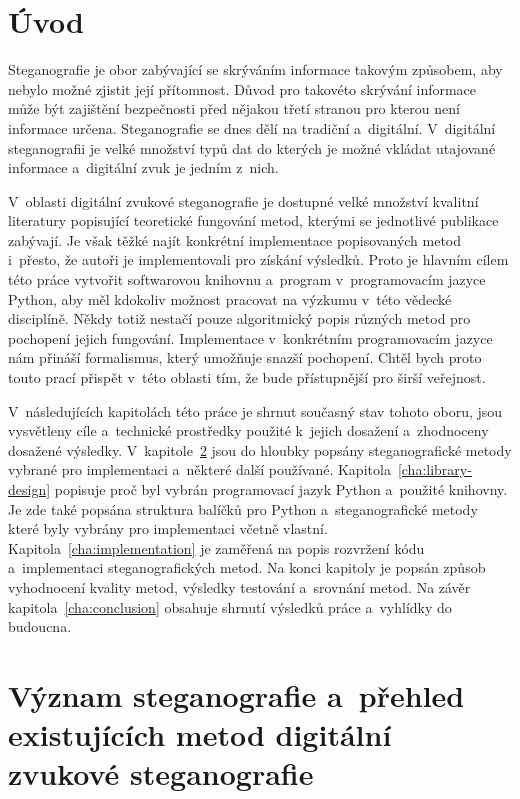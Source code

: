 \chapter{Úvod}
\label{cha:introduction}

Steganografie je obor zabývající se skrýváním informace takovým způsobem, aby
nebylo možné zjistit její přítomnost. Důvod pro takovéto skrývání informace
může být zajištění bezpečnosti před nějakou třetí stranou pro kterou není
informace určena. Steganografie se dnes dělí na tradiční a~digitální.
V~digitální steganografii je velké množství typů dat do kterých je možné
vkládat utajované informace a~digitální zvuk je jedním z~nich.

V~oblasti digitální zvukové steganografie je dostupné velké množství kvalitní
literatury popisující teoretické fungování metod, kterými se jednotlivé
publikace zabývají. Je však těžké najít konkrétní implementace popisovaných
metod i~přesto, že autoři je implementovali pro získání výsledků. Proto je
hlavním cílem této práce vytvořit softwarovou knihovnu a~program
v~programovacím jazyce Python, aby měl kdokoliv možnost pracovat na výzkumu
v~této vědecké disciplíně. Někdy totiž nestačí pouze algoritmický popis různých
metod pro pochopení jejich fungování. Implementace v~konkrétním programovacím
jazyce nám přináší formalismus, který umožňuje snazší pochopení. Chtěl bych
proto touto prací přispět v~této oblasti tím, že bude přístupnější pro širší
veřejnost.

V~následujících kapitolách této práce je shrnut současný stav tohoto oboru,
jsou vysvětleny cíle a~technické prostředky použité k~jejich dosažení
a~zhodnoceny dosažené výsledky. V~kapitole~\ref{cha:existing-methods}
 jsou do hloubky popsány steganografické metody vybrané pro
implementaci a~některé další používané. Kapitola~\ref{cha:library-design}
popisuje proč byl vybrán programovací jazyk Python a~použité knihovny. Je zde
také popsána struktura balíčků pro Python a~steganografické metody které byly
vybrány pro implementaci včetně vlastní. Kapitola~\ref{cha:implementation} je
zaměřená na popis rozvržení kódu a~implementaci steganografických metod. Na
konci kapitoly je popsán způsob vyhodnocení kvality metod, výsledky testování
a~srovnání metod. Na závěr kapitola~\ref{cha:conclusion} obsahuje shrnutí
výsledků práce a~vyhlídky do budoucna.


\chapter{Význam steganografie a~přehled existujících metod digitální zvukové
steganografie}
\label{cha:existing-methods}


